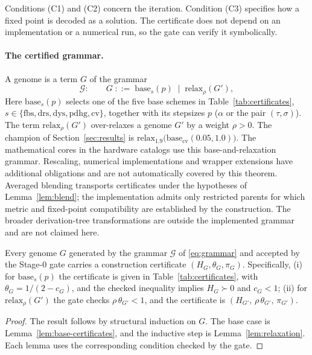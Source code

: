 Conditions (C1) and (C2) concern the iteration. Condition (C3) specifies how a
fixed point is decoded as a solution. The certificate does not depend on an
implementation or a numerical run, so the gate can verify it symbolically.

\paragraph{The certified grammar.}
A genome is a term $G$ of the grammar
\begin{equation}
 \mathcal G:\qquad
 G \;::=\; \mathrm{base}_s(p)
 \;\mid\; \mathrm{relax}_{\rho}(G') ,
 \label{eq:grammar}
\end{equation}
Here $\mathrm{base}_s(p)$ selects one of the five base schemes in
Table~\ref{tab:certificates}, $s\in\{\mathrm{fbs},\mathrm{drs},
\mathrm{dys},\mathrm{pdhg},\mathrm{cv}\}$, together with its stepsizes $p$
($\alpha$ or the pair $(\tau,\sigma)$). The term
$\mathrm{relax}_\rho(G')$ over-relaxes a genome $G'$ by a weight $\rho>0$.
The champion of Section~\ref{sec:results} is
$\mathrm{relax}_{1.9}\bigl(\mathrm{base}_{\mathrm{cv}}(0.05,1.0)\bigr)$.
The mathematical cores in the hardware catalogs use this base-and-relaxation
grammar. Rescaling, numerical implementations and wrapper extensions have
additional obligations and are not automatically covered by this theorem.
Averaged blending transports certificates under the hypotheses of
Lemma~\ref{lem:blend}; the implementation admits only restricted parents for
which metric and fixed-point compatibility are established by the construction.
The broader derivation-tree transformations are outside the implemented grammar
and are not claimed here.

\begin{theorem}
\label{thm:soundness}
Every genome $G$ generated by the grammar $\mathcal G$ of
\eqref{eq:grammar} and accepted by the Stage-0 gate carries a construction
certificate $(H_G,\theta_G,\pi_G)$. Specifically, (i) for
$\mathrm{base}_s(p)$ the certificate is given in Table~\ref{tab:certificates},
with $\theta_G=1/(2-c_G)$, and the checked
inequality implies $H_G\succ0$ and $c_G<1$;
(ii) for $\mathrm{relax}_\rho(G')$ the gate checks $\rho\,\theta_{G'}<1$, and
the certificate is $(H_{G'},\,\rho\,\theta_{G'},\,\pi_{G'})$.
\end{theorem}

\begin{proof}
The result follows by structural induction on $G$. The base case is
Lemma~\ref{lem:base-certificates}, and the inductive step is
Lemma~\ref{lem:relaxation}. Each lemma uses the corresponding condition
checked by the gate.
\end{proof}

